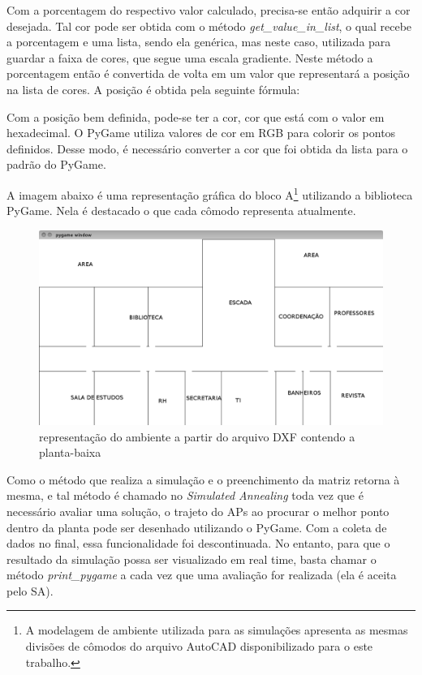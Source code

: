 \documentclass[
	12pt,				%
	openright,			%
	twoside,			%
	a4paper,			%
	english,			%
	french,				%
	spanish,			%
	brazil				%
	]{abntex2}
\begin{document}
Com a porcentagem do respectivo valor calculado, precisa-se então adquirir a cor desejada. Tal cor pode ser obtida com o método \textit{get\_value\_in\_list}, o qual recebe a porcentagem e uma lista, sendo ela genérica, mas neste caso, utilizada para guardar a faixa de cores, que segue uma escala gradiente. Neste método a porcentagem então é convertida de volta em um valor que representará a posição na lista de cores. A posição é obtida pela seguinte fórmula:



Com a posição bem definida, pode-se ter a cor, cor que está com o valor em hexadecimal. O PyGame utiliza valores de cor em RGB para colorir os pontos definidos. Desse modo, é necessário converter a cor que foi obtida da lista para o padrão do PyGame.

A imagem abaixo é uma representação gráfica do bloco A\footnote{A modelagem de ambiente utilizada para as simulações apresenta as mesmas divisões de cômodos do arquivo AutoCAD disponibilizado para o este trabalho.} utilizando a biblioteca PyGame. Nela é destacado o que cada cômodo representa atualmente.

\begin{figure}[ht]
	\caption{\label{repre_ambiente_dxf_2}representação do ambiente a partir do arquivo DXF contendo a planta-baixa}
	\begin{center}
		\includegraphics[scale=0.4]{images/planta-labels.jpg}
	\end{center}
\end{figure}

Como o método que realiza a simulação e o preenchimento da matriz retorna à mesma, e tal método é chamado no \textit{Simulated Annealing} toda vez que é necessário avaliar uma solução, o trajeto do APs ao procurar o melhor ponto dentro da planta pode ser desenhado utilizando o PyGame. Com a coleta de dados no final, essa funcionalidade foi descontinuada. No entanto, para que o resultado da simulação possa ser visualizado em real time, basta chamar o método \textit{print\_pygame} a cada vez que uma avaliação for realizada (ela é aceita pelo SA).
\end{document}
